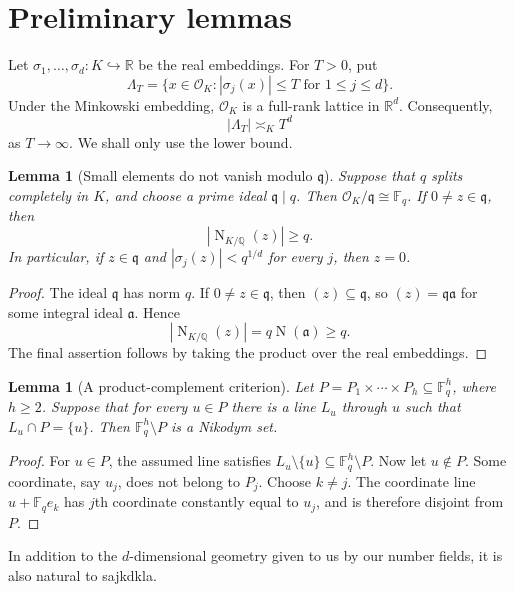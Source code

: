 \documentclass[11pt]{article}
\theoremstyle{plain}
\newtheorem{lemma}[theorem]{Lemma}
\theoremstyle{remark}
\newcommand{\F}{\mathbb F}
\newcommand{\Q}{\mathbb Q}
\newcommand{\OK}{\mathcal O_K}
\newcommand{\Nm}{\operatorname{N}_{K/\Q}}
\begin{document}
\section{Preliminary lemmas}

Let $\sigma_1,\ldots,\sigma_d:K\hookrightarrow\mathbb R$ be the real
embeddings.  For $T>0$, put
\[
  \Lambda_T=
  \{x\in\OK:|\sigma_j(x)|\leq T\text{ for }1\leq j\leq d\}.
\]
Under the Minkowski embedding, $\OK$ is a full-rank lattice in $\mathbb R^d$.
Consequently,
\begin{equation}\label{eq:lattice-count}
  |\Lambda_T|\asymp_K T^d
\end{equation}
as $T\to\infty$.  We shall only use the lower bound.

\begin{lemma}[Small elements do not vanish modulo $\mathfrak q$]
\label{lem:norm}
Suppose that $q$ splits completely in $K$, and choose a prime ideal
$\mathfrak q\mid q$.  Then $\OK/\mathfrak q\cong\F_q$.  If
$0\neq z\in\mathfrak q$, then
\[
  |\Nm(z)|\geq q.
\]
In particular, if $z\in\mathfrak q$ and
$|\sigma_j(z)|<q^{1/d}$ for every $j$, then $z=0$.
\end{lemma}

\begin{proof}
The ideal $\mathfrak q$ has norm $q$.  If $0\neq z\in\mathfrak q$, then
$(z)\subseteq\mathfrak q$, so $(z)=\mathfrak q\mathfrak a$ for some integral
ideal $\mathfrak a$.  Hence
\[
  |\Nm(z)|=q\operatorname{N}(\mathfrak a)\geq q.
\]
The final assertion follows by taking the product over the real embeddings.
\end{proof}

\begin{lemma}[A product-complement criterion]\label{lem:product}
Let $P=P_1\times\cdots\times P_h\subseteq\F_q^h$, where $h\geq2$.  Suppose
that for every $u\in P$ there is a line $L_u$ through $u$ such that
$L_u\cap P=\{u\}$.  Then $\F_q^h\setminus P$ is a Nikodym set.
\end{lemma}

\begin{proof}
For $u\in P$, the assumed line satisfies
$L_u\setminus\{u\}\subseteq\F_q^h\setminus P$.  Now let $u\notin P$.
Some coordinate, say $u_j$, does not belong to $P_j$.  Choose $k\neq j$.
The coordinate line $u+\F_qe_k$ has $j$th coordinate constantly equal to
$u_j$, and is therefore disjoint from $P$.
\end{proof}

In addition to the $d$-dimensional geometry given to us by our number fields, it is also natural to sajkdkla.
\end{document}
